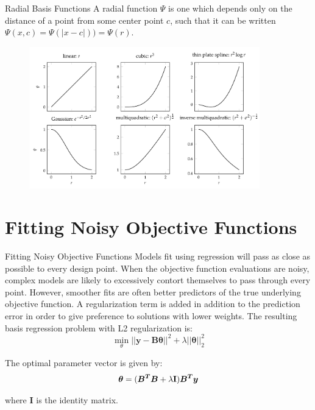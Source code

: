 \documentclass{beamer}
\begin{document}
\begin{frame}{Radial Basis Functions}
A radial function $\Psi$ is one which depends only on the distance of a point from some center point $c$, such that it can be written $\Psi(x, c) = \Psi(|x − c|)) = \Psi(r)$.

\begin{figure}
\centering
\includegraphics[width=100mm]{Figs/rbf.jpeg}
\end{figure} 

\end{frame}

\section{Fitting Noisy Objective Functions}
\begin{frame}{Fitting Noisy Objective Functions}
Models fit using regression will pass as close as possible to every design point. When the objective function evaluations are noisy, complex models are likely to excessively contort themselves to pass through every point. However, smoother fits are often better predictors of the true underlying objective function. A regularization term is added in addition to the prediction error in order to give preference to solutions with lower weights. The resulting basis regression problem with L2 regularization is:
\begin{equation*}
    \underset{\theta}{\min} ||\boldsymbol{y-B\theta}||^2 + \lambda ||\boldsymbol{\theta}||^2_2
\end{equation*}

The optimal parameter vector is given by:
\begin{equation*}
    \boldsymbol{\theta} = (\boldsymbol{B^TB} + \lambda {\bf I}) \boldsymbol{B^Ty}
\end{equation*}

where \textbf{I} is the identity matrix.
\end{frame}
\end{document}
